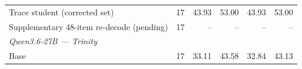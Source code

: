 \begin{table}[t]
{\begin{tabular}{lrrrrr}
Trace student (corrected set) & 17 & 43.93 & 53.00 & 43.93 & 53.00 \\
Supplementary 48-item re-decode (pending) & 17 & -- & -- & -- & -- \\
\midrule
\multicolumn{6}{l}{\textit{Qwen3.6-27B --- Trinity}} \\
Base & 17 & 33.11 & 43.58 & 32.84 & 43.13 \\

\end{tabular}}
\end{table}
